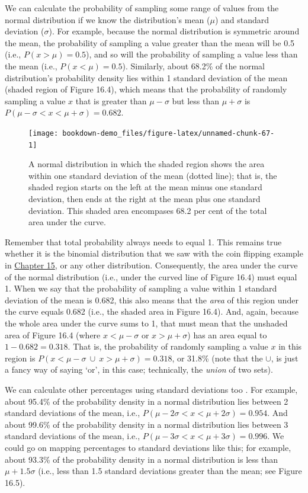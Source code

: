 \documentclass[
]{scrbook}
\begin{document}
We can calculate the probability of sampling some range of values from the normal distribution if we know the distribution's mean (\(\mu\)) and standard deviation (\(\sigma\)).
For example, because the normal distribution is symmetric around the mean, the probability of sampling a value greater than the mean will be 0.5 (i.e., \(P(x > \mu) = 0.5\)), and so will the probability of sampling a value less than the mean (i.e., \(P(x < \mu) = 0.5\)).
Similarly, about 68.2\% of the normal distribution's probability density lies within 1 standard deviation of the mean (shaded region of Figure 16.4), which means that the probability of randomly sampling a value \(x\) that is greater than \(\mu - \sigma\) but less than \(\mu + \sigma\) is \(P(\mu - \sigma < x < \mu + \sigma) = 0.682\).

\begin{figure}
\texttt{[image: bookdown-demo\_files/figure-latex/unnamed-chunk-67-1]} \caption{A normal distribution in which the shaded region shows the area within one standard deviation of the mean (dotted line); that is, the shaded region starts on the left at the mean minus one standard deviation, then ends at the right at the mean plus one standard deviation. This shaded area encompases 68.2 per cent of the total area under the curve.}\label{fig:unnamed-chunk-67}
\end{figure}

Remember that total probability always needs to equal 1.
This remains true whether it is the binomial distribution that we saw with the coin flipping example in \protect\hyperlink{Chapter_15}{Chapter 15}, or any other distribution.
Consequently, the area under the curve of the normal distribution (i.e., under the curved line of Figure 16.4) must equal 1.
When we say that the probability of sampling a value within 1 standard deviation of the mean is 0.682, this also means that the \emph{area} of this region under the curve equals 0.682 (i.e., the shaded area in Figure 16.4).
And, again, because the whole area under the curve sums to 1, that must mean that the unshaded area of Figure 16.4 (where \(x < \mu -\sigma\) or \(x > \mu + \sigma\)) has an area equal to \(1 - 0.682 = 0.318\).
That is, the probability of randomly sampling a value \(x\) in this region is \(P(x < \mu - \sigma \: \cup \: x > \mu + \sigma) = 0.318\), or 31.8\% (note that the \(\cup\), is just a fancy way of saying `or', in this case; technically, the \emph{union} of two sets).

We can calculate other percentages using standard deviations too \citep{Sokal1995}.
For example, about 95.4\% of the probability density in a normal distribution lies between 2 standard deviations of the mean, i.e., \(P(\mu - 2\sigma < x < \mu + 2\sigma) = 0.954\).
And about 99.6\% of the probability density in a normal distribution lies between 3 standard deviations of the mean, i.e., \(P(\mu - 3\sigma < x < \mu + 3\sigma) = 0.996\).
We could go on mapping percentages to standard deviations like this; for example, about 93.3\% of the probability density in a normal distribution is less than \(\mu + 1.5\sigma\) (i.e., less than 1.5 standard deviations greater than the mean; see Figure 16.5).
\end{document}
